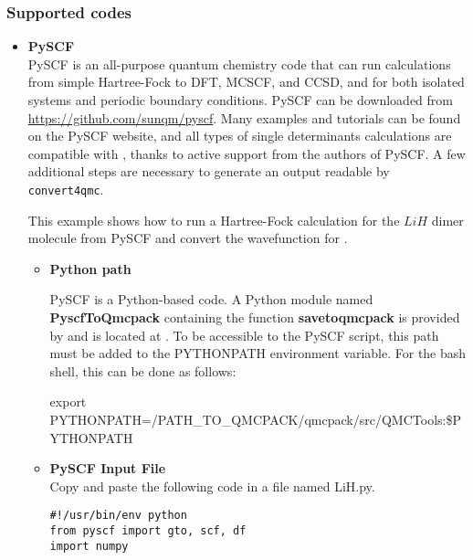 \subsubsection{Supported codes}

\begin{itemize}
\item \textbf{PySCF}\\

PySCF\cite{Sun2018} is an all-purpose quantum chemistry code that can
run calculations from simple Hartree-Fock to DFT, MCSCF, and CCSD, and
for both isolated systems and periodic boundary conditions. PySCF can
be downloaded from \url{https://github.com/sunqm/pyscf}. Many examples
and tutorials can be found on the PySCF website, and all types of
single determinants calculations are compatible with \qmcpack, thanks
to active support from the authors of PySCF. A few additional steps
are necessary to generate an output readable by \texttt{convert4qmc}.


This example shows how to run a Hartree-Fock calculation for the $LiH$
dimer molecule from PySCF and convert the wavefunction for \qmcpack.\\

\begin{itemize}
\item \textbf{Python path}\\
  \begin{sloppypar}
    PySCF is a Python-based code. A Python module named \textbf{PyscfToQmcpack} containing the function \textbf{savetoqmcpack} is provided by \qmcpack and is located at\linebreak
    .
To be accessible to the PySCF script, this path must be added to the PYTHONPATH environment variable.
For the bash shell, this can be done as follows:\\
\end{sloppypar}
\begin{shade}
 export PYTHONPATH=/PATH_TO_QMCPACK/qmcpack/src/QMCTools:\$PYTHONPATH
\end{shade}


 \item \textbf{PySCF Input File}\\
 
Copy and paste the following code in a file named LiH.py.

\begin{lstlisting}[style=Python]
#!/usr/bin/env python
from pyscf import gto, scf, df
import numpy


\end{lstlisting}
\end{itemize}
\end{itemize}
